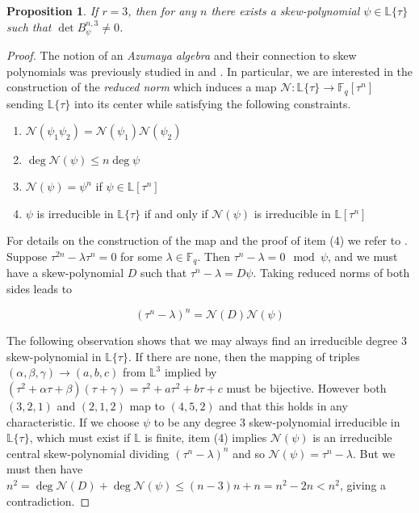 \documentclass[sigconf]{acmart}
\newtheorem{prop}{Proposition}
\newcommand{\F}{\mathbb{F}}
\renewcommand{\L}{\mathbb{L}}
\newcommand{\cN}{\mathcal{N}}
\newcommand{\sring}{\L\{\tau\}}
\newcommand{\comm}{\mathbb{F}_q[\tau^n]}
\begin{document}
\begin{prop}
If $r = 3$, then for any $n$ there exists a skew-polynomial $\psi \in \L\{\tau\}$ such that $\det B^{n,3}_{\psi} \neq 0$.
\end{prop}
\begin{proof}
The notion of an \textit{Azumaya algebra} and their connection to skew polynomials was previously studied in \cite{Ikehata1984AzumayaAA} and \cite{skewfactor}. In particular, we are interested in the construction of the \textit{reduced norm} which induces a map $\cN: \L\{\tau\} \to \comm$ sending $\sring$ into its center while satisfying the following constraints.

\begin{enumerate}
    \item $\cN(\psi_1 \psi_2) = \cN(\psi_1) \cN(\psi_2)$
    \item $\deg \cN(\psi) \leq n \deg \psi$
    \item $\cN(\psi) = \psi^n$ if $\psi \in \L[\tau^n]$
    \item $\psi$ is irreducible in $\sring$ if and only if $\cN(\psi)$ is irreducible in $\L[\tau^n]$
\end{enumerate}

For details on the construction of the map and the proof of item (4) we refer to \cite{skewfactor}. Suppose $\tau^{2n} - \lambda \tau^n = 0$ for some $\lambda \in \F_q$. Then $\tau^{n} - \lambda = 0 \mod \psi$, and we must have a skew-polynomial $D$ such that $\tau^n - \lambda = D \psi$. Taking reduced norms of both sides leads to

\begin{equation*}
(\tau^n - \lambda)^n = \cN(D)\cN(\psi)
\end{equation*}

The following observation shows that we may always find an irreducible degree 3 skew-polynomial in $\L\{\tau\}$. If there are none, then the mapping of triples $(\alpha, \beta, \gamma) \to (a, b, c)$ from $\L^3$ implied by $(\tau^2 + \alpha \tau + \beta)(\tau + \gamma) = \tau^2 + a \tau^2 + b\tau + c$ must be bijective. However both $(3, 2, 1)$ and $(2, 1, 2)$ map to $(4, 5, 2)$ and that this holds in any characteristic.  If we choose $\psi$ to be any degree 3 skew-polynomial irreducible in $\L\{\tau \}$, which must exist if $\L$ is finite, item (4) implies $\cN(\psi)$ is an irreducible central skew-polynomial dividing $(\tau^n - \lambda)^n$ and so $\cN(\psi) = \tau^n - \lambda$. But we must then have $n^2 = \deg \cN(D) + \deg \cN(\psi) \leq (n-3)n + n = n^2 - 2n < n^2$, giving a contradiction.

\end{proof}
\end{document}

